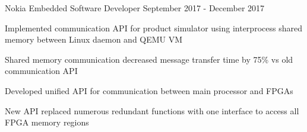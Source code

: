 

\begin{cventries}

  \cventry
    {Nokia} %
    {Embedded Software Developer} %
    {September 2017 - December 2017} %
    {}
    {
      \begin{cvitems} %
        \item {Implemented communication API for product simulator using interprocess shared memory between Linux daemon and QEMU VM}
        \item {Shared memory communication decreased message transfer time by 75\% vs old communication API}
        \item {Developed unified API for communication between main processor and FPGAs}
        \item {New API replaced numerous redundant functions with one interface to access all FPGA memory regions}
      \end{cvitems}
    }


\end{cventries}

